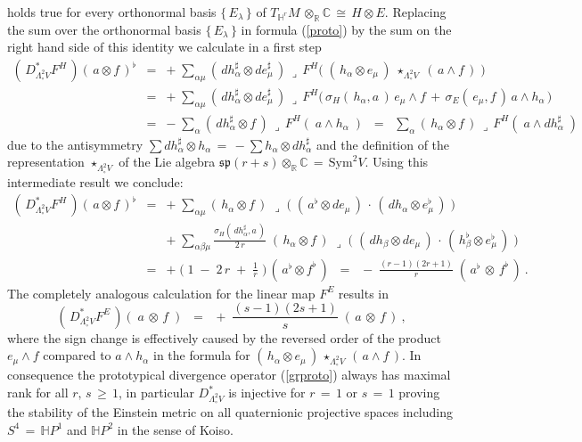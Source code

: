 \documentclass[12pt]{article}
\def\#{\sharp}
\def\b{\flat}
\def\C{\mathbb{C}}
\def\H{\mathbb{H}}
\def\ins{\lrcorner}
\def\L{\Lambda}
\def\R{\mathbb{R}}
\def\S{\mathrm{Sym}}
\def\sp{\mathfrak{sp}}
\begin{document}
 holds true for every orthonormal basis $\{\,E_\lambda\,\}$ of
 $T_{\H^r}M\,\otimes_\R\C\,\cong\,H\otimes E$. Replacing the sum
 over the orthonormal basis $\{\,E_\lambda\,\}$ in formula (\ref{proto})
 by the sum on the right hand side of this identity we calculate
 in a first step
 \begin{eqnarray*}
  (\,D^*_{\L^2_\circ V}F^H\,)(\,a\otimes f\,)^\b
  &=&
  +\;\sum_{\alpha\mu}(\,dh^\#_\alpha\otimes de^\#_\mu\,)\,\ins\,F^H\bigg(\;
  (\,h_\alpha\otimes e_\mu\,)\;\star_{\L^2_\circ V}\;(\,a\wedge f\,)\;\bigg)
  \\
  &=&
  +\;\sum_{\alpha\mu}(\,dh^\#_\alpha\otimes de^\#_\mu\,)
  \,\ins\,F^H\bigg(\,\sigma_H(\,h_\alpha,a\,)\,e_\mu\wedge f
  \,+\,\sigma_E(\,e_\mu,f\,)\,a\wedge h_\alpha\,\bigg)
  \\
  &=&
  -\;\sum_\alpha(\,dh^\#_\alpha\otimes f\,)\,\ins\,F^H(\;a\wedge h_\alpha\;)
  \;\;=\;\;
  \sum_\alpha(\,h_\alpha\otimes f\,)\,\ins\,F^H(\;a\wedge dh^\#_\alpha\;)
 \end{eqnarray*}
 due to the antisymmetry $\sum dh^\#_\alpha\otimes h_\alpha\,=\,-\sum
 h_\alpha\otimes dh^\#_\alpha$ and the definition of the representation
 $\star_{\L^2_\circ V}$ of the Lie algebra $\sp(r+s)\otimes_\R\C\,=\,\S^2V$.
 Using this intermediate result we conclude:
 \begin{eqnarray*}
  (\,D^*_{\L^2_\circ V}F^H\,)(\,a\otimes f\,)^\b
  &=&
  +\;\sum_{\alpha\mu}(\,h_\alpha\otimes f\,)\;\ins\;\bigg(\;
  (\,a^\b\otimes de_\mu\,)\,\cdot\,(\,dh_\alpha\otimes e^\b_\mu\,)\;\bigg)
  \\
  &&
  +\;\sum_{\alpha\beta\mu}\frac{\sigma_H(\,dh^\#_\alpha,a\,)}{2\,r}
  \;(\,h_\alpha\otimes f\,)\;\ins\;\bigg(\;(\,dh_\beta\otimes de_\mu\,)
  \,\cdot\,(\,h^\b_\beta\otimes e^\b_\mu\,)\;\bigg)
  \\
  &=&
  +\;\Big(\;1\;-\;2\,r\;+\;\frac1r\;)\,(\,a^\b\otimes f^\b\,)
  \;\;=\;\;
  -\;\frac{(r-1)(2r+1)}r\;(\,a^\b\,\otimes\,f^\b\,)\ .
 \end{eqnarray*}
 The completely analogous calculation for the linear map $F^E$ results in
 $$
  (\,D_{\L^2_\circ V}^*F^E\,)(\;a\,\otimes\,f\;)
  \;\;=\;\;
  +\;\frac{(s-1)(2s+1)}s\;(\,a\,\otimes\,f\,)\ ,
 $$
 where the sign change is effectively caused by the reversed order of the
 product $e_\mu\wedge f$ compared to $a\wedge h_\alpha$ in the formula for
 $(\,h_\alpha\otimes e_\mu\,)\,\star_{\L^2_\circ V}\,(\,a\wedge f\,)$. In
 consequence the prototypical divergence operator (\ref{grproto}) always
 has maximal rank for all $r,\,s\,\geq\,1$, in particular $D^*_{\L^2_\circ V}$
 is injective for $r\,=\,1$ or $s\,=\,1$ proving the stability of the Einstein
 metric on all quaternionic projective spaces including $S^4\,=\,\H P^1$ and
 $\H P^2$ in the sense of Koiso.
%
\end{document}
